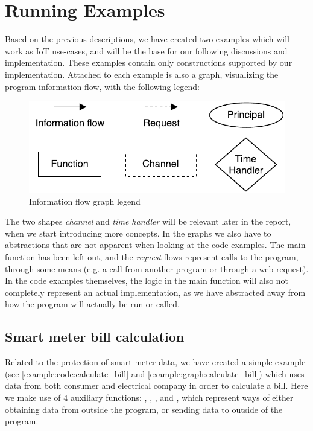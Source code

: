 
\section{Running Examples}\label{examples:sec}
Based on the previous descriptions, we have created two examples which will work as IoT use-cases, and will be the base for our following discussions and implementation.
These examples contain only constructions supported by our implementation.
Attached to each example is also a graph, visualizing the program information flow, with the following legend:
\begin{figure}[H]
  \centering
  \includegraphics[scale=0.8]{figures/dlm_legend}
  \caption{Information flow graph legend}
  \label{example:legend}
\end{figure}
The two shapes \emph{channel} and \emph{time handler} will be relevant later in the report, when we start introducing more concepts.
In the graphs we also have to abstractions that are not apparent when looking at the code examples.
The main function has been left out, and the \emph{request} flows represent calls to the program, through some means (e.g. a call from another program or through a web-request).
In the code examples themselves, the logic in the main function will also not completely represent an actual implementation, as we have abstracted away from how the program will actually be run or called.

\subsection{Smart meter bill calculation}
Related to the protection of smart meter data, we have created a simple example (see \cref{example:code:calculate_bill} and \cref{example:graph:calculate_bill}) which uses data from both consumer and electrical company in order to calculate a bill.
Here we make use of 4 auxiliary functions: , , , and , which represent ways of either obtaining data from outside the program, or sending data to outside of the program.


